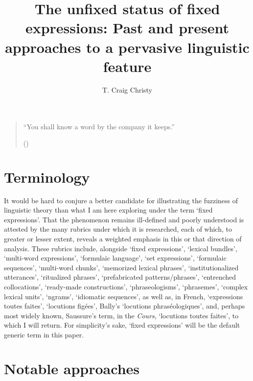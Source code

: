 \documentclass[output=paper]{langsci/langscibook}
\author{T. Craig Christy\affiliation{University of North Alabama}\orcid{}}
\title{The unfixed status of fixed expressions: Past and present approaches to a pervasive linguistic feature}
\begin{document}
\maketitle
\begin{quote}
“You shall know a word by the company it keeps.”  

(\citealt[11]{firth_synopsis_1957})
\end{quote}

\section{Terminology}

It would be hard to conjure a better candidate for illustrating the fuzziness of linguistic theory than what I am here exploring under the term ‘fixed expressions’. That the phenomenon remains ill-defined and poorly understood is attested by the many rubrics under which it is researched, each of which, to greater or lesser extent, reveals a weighted emphasis in this or that direction of analysis. These rubrics include, alongside ‘fixed expressions’, ‘lexical bundles’, ‘multi-word expressions’, ‘formulaic language’, ‘set expressions’, ‘formulaic sequences’, ‘multi-word chunks’, ‘memorized lexical phrases’, ‘institutionalized utterances’, ‘ritualized phrases’, ‘prefabricated patterns/phrases’, ‘entrenched collocations’, ‘ready-made constructions’, ‘phraseologisms’, ‘phrasemes’, ‘complex lexical units’, ‘ngrams’, ‘idiomatic sequences’, as well as, in French, ‘expressions toutes faites’, ‘locutions figées’, Bally’s ‘locutions phraséologiques’, and, perhaps most widely known, Saussure’s term, in the \textit{Cours}, ‘locutions toutes faites’, to which I will return. For simplicity’s sake, ‘fixed expressions’ will be the default generic term in this paper. 

\section{Notable approaches}
\end{document}
